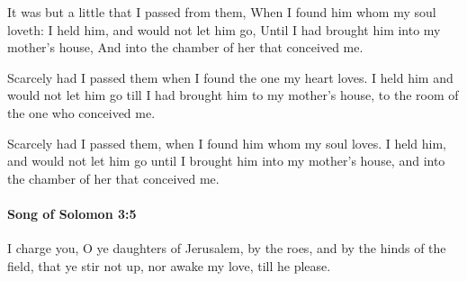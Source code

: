 			\begin{versebox}
					\item[BHS] 
					\item[LXX] 
					\item[ASV] It was but a little that I passed from them, When I found him whom my soul loveth: I held him, and would not let him go, Until I had brought him into my mother's house, And into the chamber of her that conceived me.
					\item[NIV] Scarcely had I passed them when I found the one my heart loves. I held him and would not let him go till I had brought him to my mother’s house, to the room of the one who conceived me.
					\item[NRSV] Scarcely had I passed them, when I found him whom my soul loves. I held him, and would not let him go until I brought him into my mother’s house, and into the chamber of her that conceived me.
			\end{versebox}

		\paragraph{Song of Solomon 3:5} %
			\label{SONGOFSOLOMON-3-5}

			I charge you, O ye daughters of Jerusalem, by the roes, and by the hinds of the field, that ye stir not up, nor awake my love, till he please.

